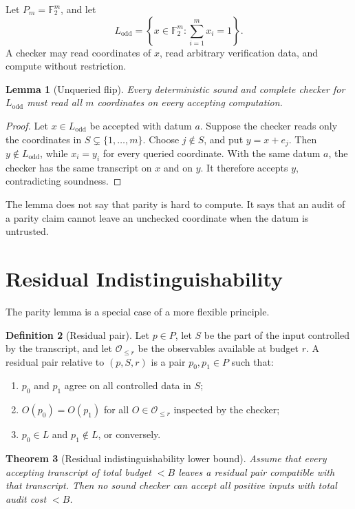 \documentclass[11pt]{article}
\newtheorem{theorem}{Theorem}[section]
\newtheorem{lemma}[theorem]{Lemma}
\theoremstyle{definition}
\newtheorem{definition}[theorem]{Definition}
\begin{document}
Let \(P_m=\mathbb F_2^m\), and let
\[
L_{\mathrm{odd}}=\left\{x\in\mathbb F_2^m:\sum_{i=1}^m x_i=1\right\}.
\]
A checker may read coordinates of \(x\), read arbitrary verification data, and compute without restriction.

\begin{lemma}[Unqueried flip]
Every deterministic sound and complete checker for \(L_{\mathrm{odd}}\) must read all \(m\) coordinates on every accepting computation.
\end{lemma}

\begin{proof}
Let \(x\in L_{\mathrm{odd}}\) be accepted with datum \(a\). Suppose the checker reads only the coordinates in \(S\subsetneq\{1,\ldots,m\}\). Choose \(j\notin S\), and put \(y=x+e_j\). Then \(y\notin L_{\mathrm{odd}}\), while \(x_i=y_i\) for every queried coordinate. With the same datum \(a\), the checker has the same transcript on \(x\) and on \(y\). It therefore accepts \(y\), contradicting soundness.
\end{proof}

The lemma does not say that parity is hard to compute. It says that an audit of a parity claim cannot leave an unchecked coordinate when the datum is untrusted.

\section{Residual Indistinguishability}

The parity lemma is a special case of a more flexible principle.

\begin{definition}[Residual pair]
Let \(p\in P\), let \(S\) be the part of the input controlled by the transcript, and let \(\mathcal O_{\leq r}\) be the observables available at budget \(r\). A residual pair relative to \((p,S,r)\) is a pair \(p_0,p_1\in P\) such that:
\begin{enumerate}[label=(\roman*)]
\item \(p_0\) and \(p_1\) agree on all controlled data in \(S\);
\item \(O(p_0)=O(p_1)\) for all \(O\in\mathcal O_{\leq r}\) inspected by the checker;
\item \(p_0\in L\) and \(p_1\notin L\), or conversely.
\end{enumerate}
\end{definition}

\begin{theorem}[Residual indistinguishability lower bound]
Assume that every accepting transcript of total budget \(<B\) leaves a residual pair compatible with that transcript. Then no sound checker can accept all positive inputs with total audit cost \(<B\).
\end{theorem}
\end{document}
